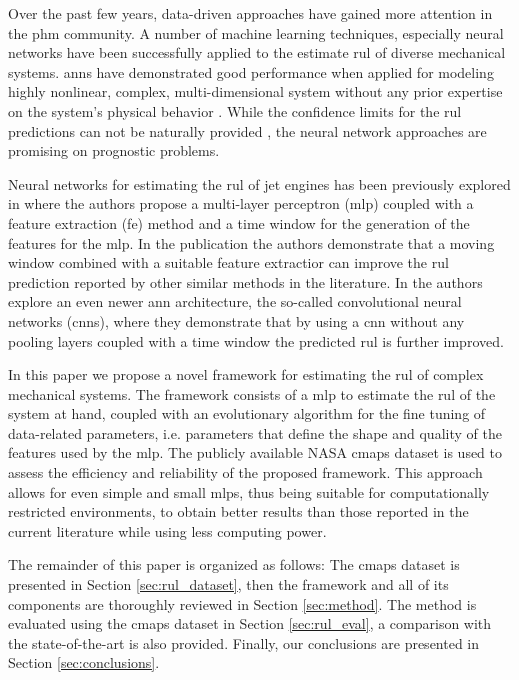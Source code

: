 Over the past few years, data-driven approaches have gained more attention in the \gls{phm} community. A number of machine learning techniques, especially neural networks have been successfully applied to the estimate \gls{rul} of diverse mechanical systems. \glspl{ann} have demonstrated good performance when applied for modeling highly nonlinear, complex, multi-dimensional system without any prior expertise on the system's physical behavior \cite{Li2018}. While the confidence limits for the \gls{rul} predictions can not be naturally provided \cite{Sikorska2011}, the neural network approaches are promising on prognostic problems.

Neural networks for estimating the \gls{rul} of jet engines has been previously explored in \cite{Lim2016} where the authors propose a multi-layer perceptron (\gls{mlp}) coupled with a feature extraction (\gls{fe}) method and a time window for the generation of the features for the \gls{mlp}. In the publication the authors demonstrate that a moving window combined with a suitable feature extractior can improve the \gls{rul} prediction reported by other similar methods in the literature. In \cite{Li2018} the authors explore an even newer \gls{ann} architecture, the so-called convolutional neural networks (\glspl{cnn}), where they demonstrate that by using a \gls{cnn} without any pooling layers coupled with a time window the predicted \gls{rul} is further improved.

In this paper we propose a novel framework for estimating the \gls{rul} of complex mechanical systems. The framework consists of a \gls{mlp} to estimate the \gls{rul} of the system at hand, coupled with an evolutionary algorithm for the fine tuning of data-related parameters, i.e. parameters that define the shape and quality of the features used by the \gls{mlp}. The publicly available NASA \gls{cmaps} dataset \cite{CMAPS2008} is used to assess the efficiency and reliability of the proposed framework. This approach allows for even simple and small \glspl{mlp}, thus being suitable for computationally restricted environments, to obtain better results than those reported in the current literature while using less computing power.

The remainder of this paper is organized as follows: The \gls{cmaps} dataset is presented in Section \ref{sec:rul_dataset}, then the framework and all of its components are thoroughly reviewed in Section \ref{sec:method}. The method is evaluated using the \gls{cmaps} dataset in Section \ref{sec:rul_eval}, a comparison with the state-of-the-art is also provided. Finally, our conclusions are presented in Section \ref{sec:conclusions}.